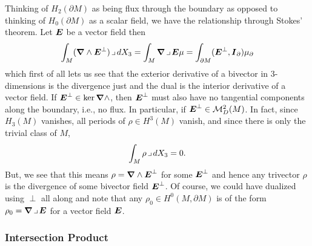 \documentclass{article}
\begin{document}
Thinking of $H_2(\partial M)$ as being flux through the boundary as opposed to thinking of $H_0(\partial M)$ as a scalar field, we have the relationship through Stokes' theorem. Let $\boldsymbol{E}$ be a vector field then
\begin{equation}
    \int_M (\boldsymbol{\nabla} \wedge \boldsymbol{E}^\perp)\hspace*{.5mm}\lrcorner \hspace*{.5mm} dX_3 = \int_M \boldsymbol{\nabla} \hspace*{.5mm}\lrcorner \hspace*{.5mm} \boldsymbol{E} \mu= \int_{\partial M} (\boldsymbol{E}^\perp,\boldsymbol{I}_\partial) \mu_\partial 
\end{equation}
which first of all lets us see that the exterior derivative of a bivector in 3-dimensions is the divergence just and the dual is the interior derivative of a vector field. If $\boldsymbol{E}^\perp \in \ker \boldsymbol{\nabla} \wedge$, then $\boldsymbol{E}^\perp$ must also have no tangential components along the boundary, i.e., no flux. In particular, if $\boldsymbol{E}^\perp \in \mathcal{M}^2_D(M)$. In fact, since $H_3(M)$ vanishes, all periods of $\rho \in H^3(M)$ vanish, and since there is only the trivial class of $M$, 
\begin{equation}
    \int_M \rho \hspace*{.5mm}\lrcorner \hspace*{.5mm} dX_3 = 0.
\end{equation}
But, we see that this means $\rho = \boldsymbol{\nabla} \wedge \boldsymbol{E}^\perp$ for some $\boldsymbol{E}^\perp$ and hence any trivector $\rho$ is the divergence of some bivector field $\boldsymbol{E}^\perp$. Of course, we could have dualized using $\perp$ all along and note that any $\rho_0 \in H^0(M,\partial M)$ is of the form $\rho_0 = \boldsymbol{\nabla} \hspace*{.5mm}\lrcorner \hspace*{.5mm} \boldsymbol{E}$ for a vector field $\boldsymbol{E}$.





\subsubsection{Intersection Product}
\end{document}
